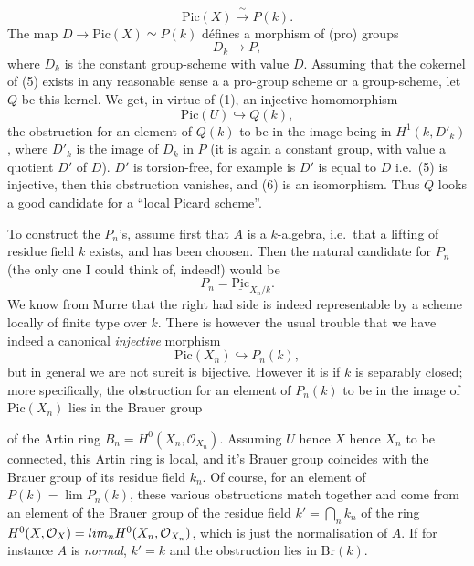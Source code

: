 \documentclass[11pt,a4paper]{article}
\begin{document}
\begin{equation*}
\tag{4} \mathrm{Pic}(X) \xrightarrow{\ \sim\ } P(k) .
\end{equation*}
The map $D \to \mathrm{Pic}(X) \simeq P(k)$ défines a morphism of (pro) groups
\begin{equation*}
\tag{5} D_k \longrightarrow P ,
\end{equation*}
where $D_k$ is the constant group-scheme with value $D$. Assuming that the
cokernel of (5) exists in any reasonable sense a a pro-group scheme or a
group-scheme, let $Q$ be this kernel. We get, in virtue of (1), an
injective homomorphism
\begin{equation*}
\tag{6} \mathrm{Pic}(U) \hookrightarrow Q(k) ,
\end{equation*}
the obstruction for an element of $Q(k)$ to be in the image being in
$H^1(k, D'_k)$, where $D'_k$ is the image of $D_k$ in $P$ (it is again a
constant group, with value a quotient $D'$ of $D$). 
 $D'$ is torsion-free, for example is $D'$
is equal to $D$ i.e.\ (5) is injective, then this obstruction vanishes, and
 (6) is an isomorphism. Thus $Q$ looks a good
candidate for a ``local Picard scheme''.

To construct the $P_n$'s, assume first that $A$ is a $k$-algebra, i.e.\ that
a lifting of   residue field $k$ exists, and has been
choosen. Then the natural candidate for $P_n$ (the only one I could think of,
indeed!) would be
\begin{equation*}
\tag{7} P_n = \underline{\mathrm{Pic}}_{X_n/k} .
\end{equation*}
We know from Murre that the right had side is indeed representable by a scheme
locally of finite type over $k$. There is however the usual trouble that we
have indeed a canonical \emph{injective} morphism
\begin{equation*}
\tag{8} \mathrm{Pic}(X_n) \hookrightarrow P_n(k) ,
\end{equation*}
but in general we are not sureit is bijective. However it is if $k$ is
separably closed; more specifically, the obstruction for an element of
$P_n(k)$ to be in the image of $\mathrm{Pic}(X_n)$ lies in the Brauer group

of the Artin ring $B_n = H^0(X_n, \mathcal{O}_{X_n})$. Assuming $U$ hence $X$
hence $X_n$ to be connected, this Artin ring is local, and it's Brauer group
coincides with the Brauer group of its residue field $k_n$. Of course, for an
element of $P(k) = \lim P_n(k)$, these various obstructions match together and
come from an element of the Brauer group of the residue field
$k' = \bigcap_n k_n$ of the ring
$H^0(X, \mathcal{O}_X) = \varprojlim_n H^0(X_n, \mathcal{O}_{X_n})$,
 which is just the normalisation of $A$. If for instance $A$ is
\emph{normal},  $k' = k$ and the obstruction lies in
$\mathrm{Br}(k)$.
\end{document}

